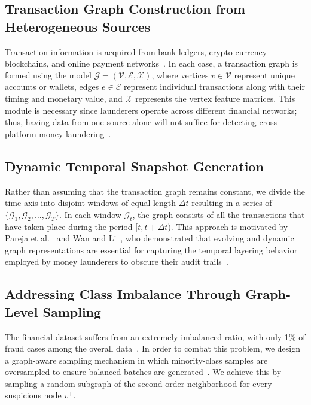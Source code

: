 \documentclass[conference]{IEEEtran}
\begin{document}
\subsection{Transaction Graph Construction from Heterogeneous Sources}
Transaction information is acquired from bank ledgers, crypto-currency blockchains, and online payment networks~\cite{cheng2023}. In each case, a transaction graph is formed using the model \(\mathcal{G} = (\mathcal{V},\mathcal{E},\mathcal{X})\), where vertices \(v\in \mathcal{V}\) represent unique accounts or wallets, edges \(e\in \mathcal{E}\) represent individual transactions along with their timing and monetary value, and \(\mathcal{X}\) represents the vertex feature matrices. This module is necessary since launderers operate across different financial networks; thus, having data from one source alone will not suffice for detecting cross-platform money laundering~\cite{han2020, egressy2024}.

\subsection{Dynamic Temporal Snapshot Generation}
Rather than assuming that the transaction graph remains constant, we divide the time axis into disjoint windows of equal length \(\Delta t\) resulting in a series of \(\{\mathcal{G}_1,\mathcal{G}_2,\ldots ,\mathcal{G}_T\}\). In each window \(\mathcal{G}_t\), the graph consists of all the transactions that have taken place during the period \([t,t + \Delta t)\). This approach is motivated by Pareja et al.~\cite{pareja2020} and Wan and Li~\cite{wan2024}, who demonstrated that evolving and dynamic graph representations are essential for capturing the temporal layering behavior employed by money launderers to obscure their audit trails~\cite{alarab2022}.

\subsection{Addressing Class Imbalance Through Graph-Level Sampling}
The financial dataset suffers from an extremely imbalanced ratio, with only 1\% of fraud cases among the overall data~\cite{hilal2022}. In order to combat this problem, we design a graph-aware sampling mechanism in which minority-class samples are oversampled to ensure balanced batches are generated~\cite{vassallo2021, altman2023}. We achieve this by sampling a random subgraph of the second-order neighborhood for every suspicious node \(v^{+}\).
\end{document}
